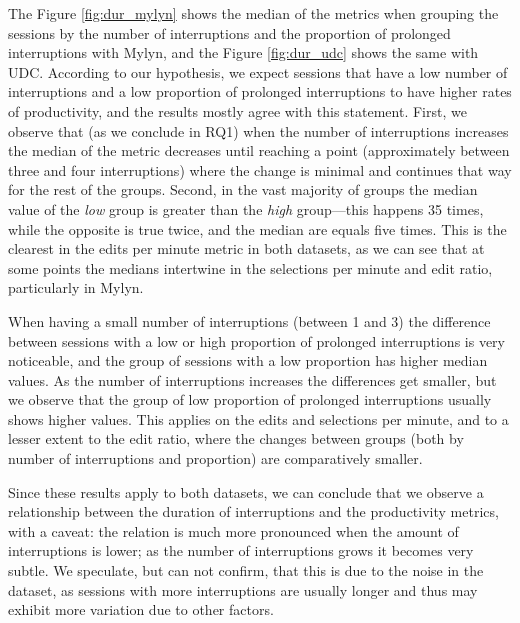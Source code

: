 \documentclass[times]{smrauth}
\begin{document}

The Figure \ref{fig:dur_mylyn} shows the median of the metrics when grouping the sessions by the number of interruptions and the proportion of prolonged interruptions with Mylyn, and the Figure \ref{fig:dur_udc} shows the same with UDC. According to our hypothesis, we expect sessions that have a low number of interruptions and a low proportion of prolonged interruptions to have higher rates of productivity, and the results mostly agree with this statement. First, we observe that (as we conclude in RQ1) when the number of interruptions increases the median of the metric decreases until reaching a point (approximately between three and four interruptions) where the change is minimal and continues that way for the rest of the groups. Second, in the vast majority of groups the median value of the \emph{low} group is greater than the \emph{high} group---this happens 35 times, while the opposite is true twice, and the median are equals five times. This is the clearest in the edits per minute metric in both datasets, as we can see that at some points the medians intertwine in the selections per minute and edit ratio, particularly in Mylyn.

When having a small number of interruptions (between 1 and 3) the difference between sessions with a low or high proportion of prolonged interruptions is very noticeable, and the group of sessions with a low proportion has higher median values. As the number of interruptions increases the differences get smaller, but we observe that the group of low proportion of prolonged interruptions usually shows higher values. This applies on the edits and selections per minute, and to a lesser extent to the edit ratio, where the changes between groups (both by number of interruptions and proportion) are comparatively smaller.

Since these results apply to both datasets, we can conclude that we observe a relationship between the duration of interruptions and the productivity metrics, with a caveat: the relation is much more pronounced when the amount of interruptions is lower; as the number of interruptions grows it becomes very subtle. We speculate, but can not confirm, that this is due to the noise in the dataset, as sessions with more interruptions are usually longer and thus may exhibit more variation due to other factors.
\end{document}
